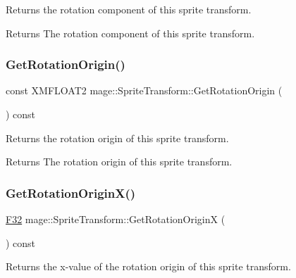 Returns the rotation component of this sprite transform.

\begin{DoxyReturn}{Returns}
The rotation component of this sprite transform. 
\end{DoxyReturn}
\hypertarget{structmage_1_1_sprite_transform_aa7a6f3cad38ed9231455de722e60040c}{}\label{structmage_1_1_sprite_transform_aa7a6f3cad38ed9231455de722e60040c} 
\subsubsection{\texorpdfstring{Get\+Rotation\+Origin()}{GetRotationOrigin()}}
{\footnotesize\ttfamily const X\+M\+F\+L\+O\+A\+T2 mage\+::\+Sprite\+Transform\+::\+Get\+Rotation\+Origin (\begin{DoxyParamCaption}{ }\end{DoxyParamCaption}) const\hspace{0.3cm}{\ttfamily [noexcept]}}

Returns the rotation origin of this sprite transform.

\begin{DoxyReturn}{Returns}
The rotation origin of this sprite transform. 
\end{DoxyReturn}
\hypertarget{structmage_1_1_sprite_transform_a980beb77dc4b64a2d784361d61981f9c}{}\label{structmage_1_1_sprite_transform_a980beb77dc4b64a2d784361d61981f9c} 
\subsubsection{\texorpdfstring{Get\+Rotation\+Origin\+X()}{GetRotationOriginX()}}
{\footnotesize\ttfamily \hyperlink{namespacemage_aa97e833b45f06d60a0a9c4fc22ae02c0}{F32} mage\+::\+Sprite\+Transform\+::\+Get\+Rotation\+OriginX (\begin{DoxyParamCaption}{ }\end{DoxyParamCaption}) const\hspace{0.3cm}{\ttfamily [noexcept]}}

Returns the x-\/value of the rotation origin of this sprite transform.

